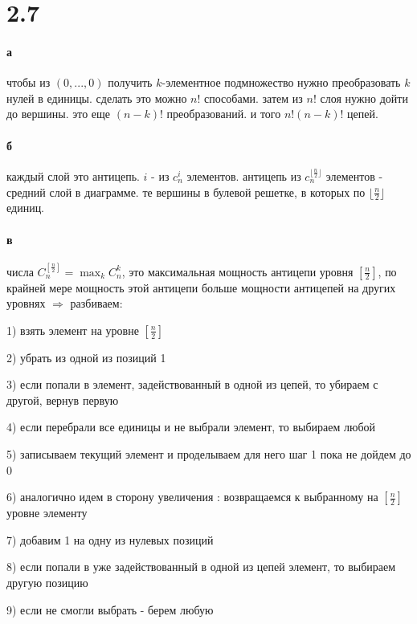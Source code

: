 \documentclass[russian]{article}
\begin{document}
\section*{2.7}

\paragraph*{а}

чтобы из $(0,...,0)$ получить $k$-элементное подмножество нужно преобразовать $k$ нулей в единицы. сделать это можно $n!$ способами. затем из $n!$ слоя нужно дойти до вершины. это еще $(n-k)!$ преобразований. и того $n!(n-k)!$ цепей. 

\paragraph*{б}

каждый слой это антицепь. $i$ - из $c_n^i$ элементов. антицепь из $c_n^{\lfloor\frac{n}{2}\rfloor}$ элементов - средний слой в диаграмме. те вершины в булевой решетке, в которых по $\lfloor\frac{n}{2}\rfloor$ единиц.

\paragraph*{в}

числа $C_n^{[\frac{n}{2}]}=\max_k C_n^k$, это максимальная мощность антицепи уровня $[\frac{n}{2}]$, по крайней мере мощность этой антицепи больше мощности антицепей на других уровнях $\Rightarrow$ разбиваем:

1) взять элемент на уровне $[\frac{n}{2}]$

2) убрать из одной из позиций 1

3) если попали в элемент, задействованный в одной из цепей, то убираем с другой, вернув первую

4) если перебрали все единицы и не выбрали элемент, то выбираем любой

5) записываем текущий элемент и проделываем для него шаг 1 пока не дойдем до 0

6) аналогично идем в сторону увеличения : возвращаемся к выбранному на $[\frac{n}{2}]$ уровне элементу

7) добавим 1 на одну из нулевых позиций

8) если попали в уже задействованный в одной из цепей элемент, то выбираем другую позицию

9) если не смогли выбрать - берем любую
\end{document}
